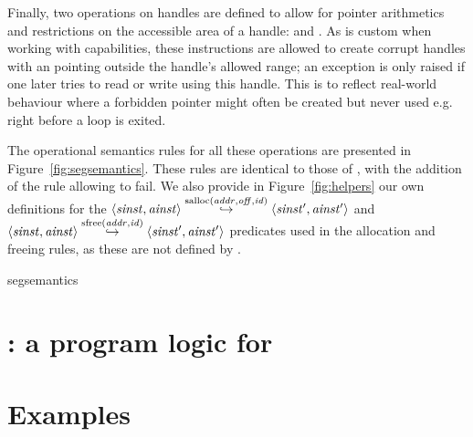 \documentclass[acmsmall,screen]{acmart}\settopmatter{}
\begin{document}
Finally, two operations on handles are defined to allow for pointer arithmetics and restrictions on the accessible area of a handle: \xxWhandleadd and \xxWslice. As is custom when working with capabilities, these instructions are allowed to create corrupt handles with an \xxWoffset pointing outside the handle's allowed range; an exception is only raised if one later tries to read or write using this handle. This is to reflect real-world behaviour where a forbidden pointer might often be created but never used e.g. right before a loop is exited.

The operational semantics rules for all these operations are presented in Figure~\ref{fig:segsemantics}. These rules are identical to those of \citet{mswasm}, with the addition of the rule allowing \xxWsegalloc to fail. We also provide in Figure~\ref{fig:helpers} our own definitions for the \( \langle \mathit{sinst}, \mathit{ainst} \rangle\overset{\mathrm{salloc}(\mathit{addr}, \mathit{off}, \mathit{id})}{\hookrightarrow}\langle \mathit{sinst}', \mathit{ainst}' \rangle \) and \( \langle \mathit{sinst}, \mathit{ainst} \rangle\overset{\mathrm{sfree}(\mathit{addr}, \mathit{id})}{\hookrightarrow}\langle \mathit{sinst}', \mathit{ainst}' \rangle \) predicates used in the allocation and freeing rules, as these are not defined by \citet{mswasm}.


{segsemantics}







\section{\irismswasm: a program logic for \mswasm}

\section{Examples}





\end{document}
